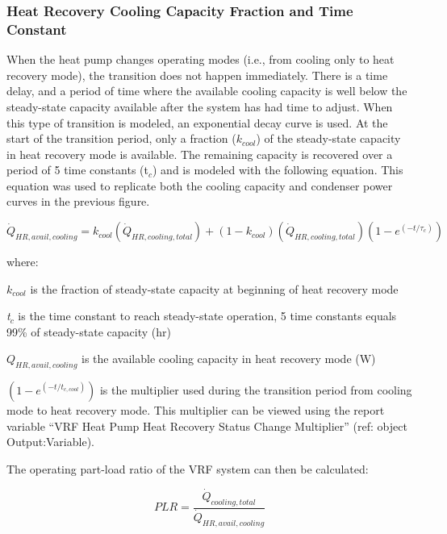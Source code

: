 \subsubsection{Heat Recovery Cooling Capacity Fraction and Time Constant}\label{heat-recovery-cooling-capacity-fraction-and-time-constant}

When the heat pump changes operating modes (i.e., from cooling only to heat recovery mode), the transition does not happen immediately. There is a time delay, and a period of time where the available cooling capacity is well below the steady-state capacity available after the system has had time to adjust. When this type of transition is modeled, an exponential decay curve is used. At the start of the transition period, only a fraction (\(k_{cool}\)) of the steady-state capacity in heat recovery mode is available. The remaining capacity is recovered over a period of 5 time constants (t\(_{c}\)) and is modeled with the following equation. This equation was used to replicate both the cooling capacity and condenser power curves in the previous figure.

\begin{equation}
  \dot{Q}_{HR,avail,cooling} = k_{cool} \left( \dot{Q}_{HR,cooling,total} \right) + \left( 1 - k_{cool} \right) \left( \dot{Q}_{HR,cooling,total} \right) \left( 1 - e^{\left( -t / \tau_c \right)}  \right)
\end{equation}

where:

\(k_{cool}\) is the fraction of steady-state capacity at beginning of heat recovery mode

\emph{t}\(_c\) is the time constant to reach steady-state operation, 5 time constants equals 99\% of steady-state capacity (hr)

\(Q_{HR,avail,cooling}\) is the available cooling capacity in heat recovery mode (W)

\(\left( 1 - e^{\left( -t / t_{c,cool} \right)} \right)\) is the multiplier used during the transition period from cooling mode to heat recovery mode. This multiplier can be viewed using the report variable ``VRF Heat Pump Heat Recovery Status Change Multiplier'' (ref: object Output:Variable).

The operating part-load ratio of the VRF system can then be calculated:

\begin{equation}
  PLR = \frac{\dot{Q}_{cooling,total}}{\dot{Q}_{HR,avail,cooling}}
\end{equation}


